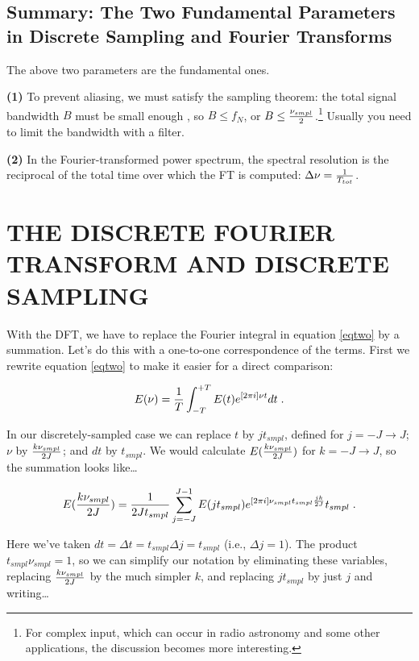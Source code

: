 \documentclass[11pt,preprint]{aastex}
\begin{document}
\subsection {Summary: The Two Fundamental Parameters in Discrete
Sampling and Fourier Transforms}

	The above two parameters are the fundamental ones.  

	{\bf (1)} To prevent aliasing, we must satisfy the sampling
theorem: the total signal bandwidth $B$ must be small enough , so $B
\leq f_N$, or $B \leq {\nu_{smpl} \over 2}$.\footnote{For complex input,
which can occur in radio astronomy and some other applications, the
discussion becomes more interesting.} Usually you need to limit the
bandwidth with a filter.

	{\bf (2)} In the Fourier-transformed power spectrum, the spectral
resolution is the reciprocal of the total time over which the FT is
computed: $\Delta \nu ={1 \over T_{tot}}$. 

\section{THE DISCRETE FOURIER TRANSFORM AND DISCRETE SAMPLING}

\label{four}

	With the DFT, we have to replace the Fourier integral in
equation \ref{eqtwo} by a summation.  Let's do this with a one-to-one
correspondence of the terms. First we rewrite equation \ref{eqtwo} to
make it easier for a direct comparison:

\begin{equation} \label{eqtwoa}
E(\nu) = {1 \over T}
\int_{-T}^{+T} E(t) e^{[2 \pi i]\nu t}  dt \; .
\end{equation}

	In our discretely-sampled case we can replace $t$ by $j
t_{smpl}$, defined for $j = -J \rightarrow J$; $\nu$ by ${k\nu_{smpl}
\over 2J}$; and $dt$ by $t_{smpl}$.  We would calculate
$E({k\nu_{smpl}\over 2J})$ for $k = -J \rightarrow J$, so the summation
looks like\dots

\begin{equation} \label{eqfivea}
E({k\nu_{smpl} \over 2J}) = {1 \over 2Jt_{smpl}} \sum_{j=-J}^{J-1}  E(j
t_{smpl}) e^{[2 \pi i] \nu_{smpl}t_{smpl} {jk \over 2J}} t_{smpl} \; .
\end{equation}

\noindent Here we've taken $dt = \Delta t = t_{smpl} \Delta j =
t_{smpl}$ (i.e., $\Delta j=1$).  The product $t_{smpl}\nu_{smpl} = 1$,
so we can simplify our notation by eliminating these variables,
replacing ${k\nu_{smpl} \over 2J}$ by the much simpler $k$, and
replacing $j t_{smpl}$ by just $j$ and writing\dots
\end{document}
